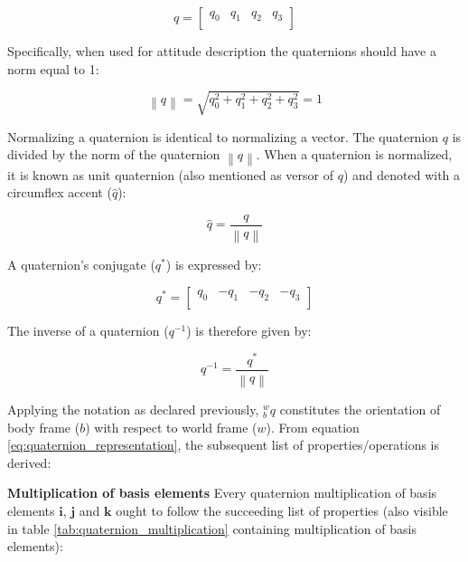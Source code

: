 \begin{equation}
    q =     \begin{bmatrix}
        q_0 & q_1 & q_2 & q_3 \\
    \end{bmatrix}
    \label{eq:quaternion_vector}
\end{equation}

Specifically, when used for attitude description the quaternions should have a norm equal to 1:

\begin{equation}
    \left\lVert q\right\rVert =\sqrt{q^2_0 + q^2_1 + q^2_2 + q^2_3} =1
\end{equation}

Normalizing a quaternion is identical to normalizing a vector. The quaternion $q$ is divided by the norm of the quaternion $\left\lVert q \right\rVert$. When a quaternion is normalized, it is known as unit quaternion (also mentioned as versor of $q$) and denoted with a circumflex accent ($\hat{q}$):

\begin{equation}
    \hat{q} = \frac{q}{\left\lVert q \right\rVert }
\end{equation}


A quaternion's conjugate ($q^{\ast} $) is expressed by:

\begin{equation}
    q^{\ast}  =\begin{bmatrix}
        q_0 & -q_1 & -q_2 & -q_3 \\
    \end{bmatrix}
\end{equation}

The inverse of a quaternion (${q^{-1}}$) is therefore given by:

\begin{equation}
    q^{-1} = \frac{q^{\ast} }{\left\lVert q \right\rVert }
\end{equation}

Applying the notation as declared previously, ${^w_b}q$ constitutes the orientation of body frame ($b$) with respect to world frame ($w$). From equation \ref{eq:quaternion_representation}, the subsequent list of properties/operations is derived:

\item \textbf{Multiplication of basis elements} Every quaternion multiplication of basis elements $\boldsymbol{i}$, $\boldsymbol{j}$ and $\boldsymbol{k}$ ought to follow the succeeding list of properties (also visible in table \ref{tab:quaternion_multiplication} containing multiplication of basis elements):


